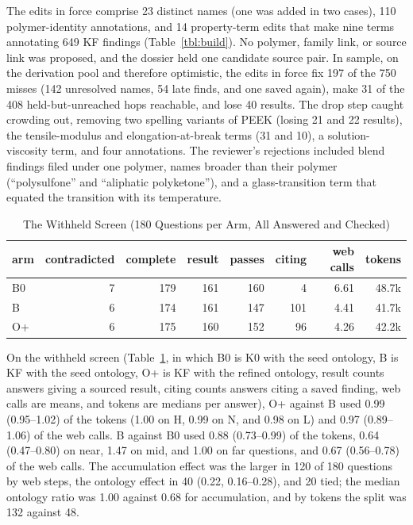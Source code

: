 \documentclass[journal=mamobx,manuscript=suppinfo]{achemso}
\begin{document}
The edits in force comprise 23 distinct names (one was added in two cases), 110 polymer-identity annotations, and 14 property-term edits that make nine terms annotating 649 KF findings (Table~\ref{tbl:build}).
No polymer, family link, or source link was proposed, and the dossier held one candidate source pair.
In sample, on the derivation pool and therefore optimistic, the edits in force fix 197 of the 750 misses (142 unresolved names, 54 late finds, and one saved again), make 31 of the 408 held-but-unreached hops reachable, and lose 40 results.
The drop step caught crowding out, removing two spelling variants of PEEK (losing 21 and 22 results), the tensile-modulus and elongation-at-break terms (31 and 10), a solution-viscosity term, and four annotations.
The reviewer's rejections included blend findings filed under one polymer, names broader than their polymer (``polysulfone'' and ``aliphatic polyketone''), and a glass-transition term that equated the transition with its temperature.

\begin{table}
  \caption{The Withheld Screen (180 Questions per Arm, All Answered and Checked)}
  \label{tbl:screen}
  \small
  \begin{tabular}{lrrrrrrr}
    \toprule
    arm & contradicted & complete & result & passes & citing & web calls & tokens \\
    \midrule
    B0 & 7 & 179 & 161 & 160 & 4 & 6.61 & 48.7k \\
    B & 6 & 174 & 161 & 147 & 101 & 4.41 & 41.7k \\
    O+ & 6 & 175 & 160 & 152 & 96 & 4.26 & 42.2k \\
    \bottomrule
  \end{tabular}
\end{table}

On the withheld screen (Table~\ref{tbl:screen}, in which B0 is K0 with the seed ontology, B is KF with the seed ontology, O+ is KF with the refined ontology, result counts answers giving a sourced result, citing counts answers citing a saved finding, web calls are means, and tokens are medians per answer), O+ against B used 0.99 (0.95--1.02) of the tokens (1.00 on H, 0.99 on N, and 0.98 on L) and 0.97 (0.89--1.06) of the web calls.
B against B0 used 0.88 (0.73--0.99) of the tokens, 0.64 (0.47--0.80) on near, 1.47 on mid, and 1.00 on far questions, and 0.67 (0.56--0.78) of the web calls.
The accumulation effect was the larger in 120 of 180 questions by web steps, the ontology effect in 40 (0.22, 0.16--0.28), and 20 tied; the median ontology ratio was 1.00 against 0.68 for accumulation, and by tokens the split was 132 against 48.
\end{document}
